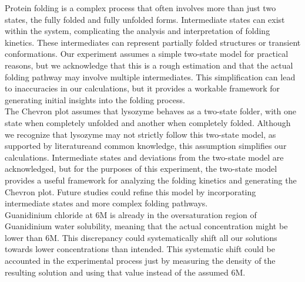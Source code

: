 \documentclass[a4paper,english,12pt,bibliography=totoc]{scrreprt}
\begin{document}

Protein folding is a complex process that often involves more than just two states, the fully folded and fully unfolded forms. Intermediate states can exist within the system, complicating the analysis and interpretation of folding kinetics. These intermediates can represent partially folded structures or transient conformations. Our experiment assumes a simple two-state model for practical reasons, but we acknowledge that this is a rough estimation and that the actual folding pathway may involve multiple intermediates. This simplification can lead to inaccuracies in our calculations, but it provides a workable framework for generating initial insights into the folding process.\\


The Chevron plot assumes that lysozyme behaves as a two-state folder, with one state when completely unfolded and another when completely folded. Although we recognize that lysozyme may not strictly follow this two-state model, as supported by literature\cite{sasahara}and common knowledge, this assumption simplifies our calculations. Intermediate states and deviations from the two-state model are acknowledged, but for the purposes of this experiment, the two-state model provides a useful framework for analyzing the folding kinetics and generating the Chevron plot. Future studies could refine this model by incorporating intermediate states and more complex folding pathways.\\


Guanidinium chloride at 6M is already in the oversaturation region of Guanidinium water solubility, meaning that the actual concentration might be lower than 6M. This discrepancy could systematically shift all our solutions towards lower concentrations than intended.
This systematic shift  could be accounted in the experimental process just by measuring the density of the resulting solution and using that value instead of the assumed 6M.\\
\end{document}
